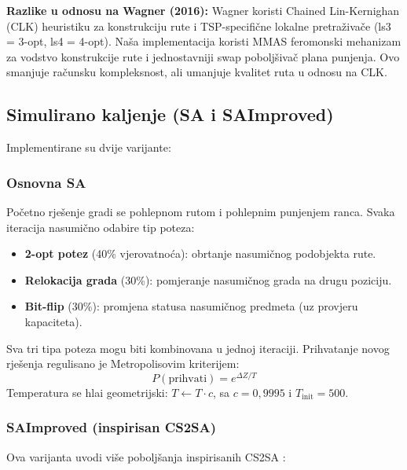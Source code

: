 \documentclass[12pt,a4paper]{article}
\begin{document}
\textbf{Razlike u odnosu na Wagner (2016):} Wagner koristi Chained Lin-Kernighan (CLK) heuristiku za konstrukciju rute i TSP-specifi\v{c}ne lokalne pretra\v{z}iva\v{c}e (ls3 = 3-opt, ls4 = 4-opt). Na\v{s}a implementacija koristi MMAS feromonski mehanizam za vodstvo konstrukcije rute i jednostavniji swap pobolj\v{s}iva\v{c} plana punjenja. Ovo smanjuje ra\v{c}unsku kompleksnost, ali umanjuje kvalitet ruta u odnosu na CLK.

\subsection{Simulirano kaljenje (SA i SAImproved)}

Implementirane su dvije varijante:

\subsubsection{Osnovna SA}

Po\v{c}etno rje\v{s}enje gradi se pohlepnom rutom i pohlepnim punjenjem ranca. Svaka iteracija nasumi\v{c}no odabire tip poteza:
\begin{itemize}
    \item \textbf{2-opt potez} (40\% vjerovatno\'{c}a): obrtanje nasumi\v{c}nog podobjekta rute.
    \item \textbf{Relokacija grada} (30\%): pomjeranje nasumi\v{c}nog grada na drugu poziciju.
    \item \textbf{Bit-flip} (30\%): promjena statusa nasumi\v{c}nog predmeta (uz provjeru kapaciteta).
\end{itemize}
Sva tri tipa poteza mogu biti kombinovana u jednoj iteraciji. Prihvatanje novog rje\v{s}enja regulisano je Metropolisovim kriterijem:
\begin{equation}
    P(\text{prihvati}) = e^{\Delta Z / T}
\end{equation}
Temperatura se hla\dj{}i geometrijski: $T \leftarrow T \cdot c$, sa $c = 0{,}9995$ i $T_{\text{init}} = 500$.

\subsubsection{SAImproved (inspirisan CS2SA)}

Ova varijanta uvodi vi\v{s}e pobolj\v{s}anja inspirisanih CS2SA \cite{yafrani2016}:
\end{document}
